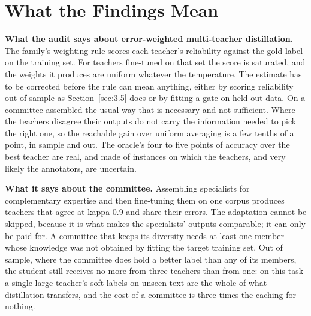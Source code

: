 \section{What the Findings Mean}
\label{sec:6.2}

\textbf{What the audit says about error-weighted multi-teacher distillation.} The family's weighting
rule scores each teacher's reliability against the gold label on the training set. For teachers
fine-tuned on that set the score is saturated, and the weights it produces are uniform whatever the
temperature. The estimate has to be corrected before the rule can mean anything, either by scoring
reliability out of sample as Section~\ref{sec:3.5} does or by fitting a gate on held-out data. On a
committee assembled the usual way that is necessary and not sufficient. Where the teachers disagree
their outputs do not carry the information needed to pick the right one, so the reachable gain over
uniform averaging is a few tenths of a point, in sample and out. The oracle's four to five points of
accuracy over the best teacher are real, and made of instances on which the teachers, and very
likely the annotators, are uncertain.

\textbf{What it says about the committee.} Assembling specialists for complementary expertise and
then fine-tuning them on one corpus produces teachers that agree at kappa 0.9 and share their
errors. The adaptation cannot be skipped, because it is what makes the specialists' outputs
comparable; it can only be paid for. A committee that keeps its diversity needs at least one member
whose knowledge was not obtained by fitting the target training set. Out of sample, where the
committee does hold a better label than any of its members, the student still receives no more from
three teachers than from one: on this task a single large teacher's soft labels on unseen text are
the whole of what distillation transfers, and the cost of a committee is three times the caching for
nothing.

